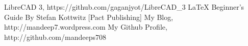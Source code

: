 \begin{thebibliography}{9}
\bibitem{} LibreCAD 3, https://github.com/gaganjyot/LibreCAD\_3
\bibitem{} \LaTeX{} Beginner's Guide By Stefan Kottwitz [Pact Publishing]
\bibitem{} My Blog, http://mandeep7.wordpress.com
\bibitem{} My Github Profile, http://github.com/mandeeps708
\end{thebibliography}

